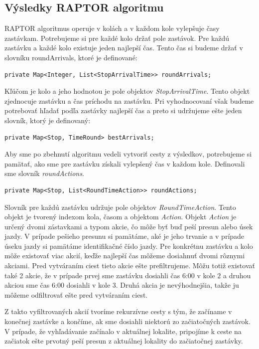 \subsection{Výsledky RAPTOR algoritmu}
RAPTOR algoritmus operuje v kolách a v každom kole vylepšuje časy zastávkam. Potrebujeme si pre každé kolo držať pole zastávok. Pre každú zastávku a každé kolo existuje jeden najlepší čas. Tento čas si budeme držať v slovníku roundArrivals, ktoré je definované:
\begin{lstlisting}
private Map<Integer, List<StopArrivalTime>> roundArrivals; 
\end{lstlisting}
Kľúčom je kolo a jeho hodnotou je pole objektov \textit{StopArrivalTime}. Tento objekt zjednocuje zastávku a čas príchodu na zastávku. Pri vyhodnocovaní však budeme potrebovať hľadať podľa zastávky najlepší čas a preto si udržujeme ešte jeden slovník, ktorý je definovaný:
\begin{lstlisting}
private Map<Stop, TimeRound> bestArrivals;
\end{lstlisting}
Aby sme po zbehnutí algoritmu vedeli vytvoriť cesty z výsledkov, potrebujeme si pamätať, ako sme pre zastávku získali  vylepšený čas v každom kole. Definovali sme slovník \textit{roundActions}.
\begin{lstlisting}
private Map<Stop, List<RoundTimeAction>> roundActions;
\end{lstlisting}
Slovník pre každú zastávku udržuje pole objektov \textit{RoundTimeAction}. Tento objekt je tvorený indexom kola, časom a objektom \textit{Action}. Objekt \textit{Action} je určený dvomi zástavkami a typom akcie, čo môže byť buď peší presun alebo úsek jazdy. V prípade pešieho presunu si pamätáme, aké je jeho trvanie a v prípade úseku jazdy si pamätáme identifikačné číslo jazdy. Pre konkrétnu zastávku a kolo môže existovať viac akcií, keďže najlepší čas môžeme dosiahnuť dvomi rôznymi akciami. Pred vytváraním ciest tieto akcie ešte prefiltrujeme. Môžu totiž existovať také 2 akcie, že v prípade prvej sme zastávku dosiahli čas 6:00 v kole $2$ a druhou akciou sme čas 6:00 dosiahli v kole $3$. Druhá akcia je nevýhodnejšia, takže ju môžeme odfiltrovať ešte pred vytváraním ciest.

Z takto vyfiltrovaných akcií tvoríme rekurzívne cesty s tým, že začíname v konečnej zastávke a končíme, ak sme dosiahli niektorú zo začiatočných zastávok. V prípade, že vyhľadávanie začínalo v aktuálnej lokalite, pripojíme k ceste na začiatok ešte prvotný peší presun z aktuálnej lokality do začiatočnej zastávky.

